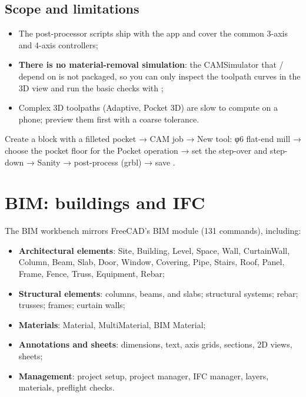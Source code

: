 \subsection{Scope and limitations}

\begin{itemize}
  \item The post-processor scripts ship with the app and cover the common 3-axis and 4-axis controllers;
  \item \textbf{There is no material-removal simulation}: the CAMSimulator that
        / depend on is not packaged, so you can only inspect the toolpath
        curves in the 3D view and run the basic checks with ;
  \item Complex 3D toolpaths (Adaptive, Pocket 3D) are slow to compute on a phone; preview them first with a coarse tolerance.
\end{itemize}

\begin{practice}
Create a block with a filleted pocket → CAM job → New tool: φ6 flat-end mill → choose the pocket floor for the Pocket operation →
set the step-over and step-down → Sanity → post-process (grbl) → save .
\end{practice}

\section{BIM: buildings and IFC}

The BIM workbench mirrors FreeCAD's BIM module (131 commands), including:

\begin{itemize}
  \item \textbf{Architectural elements}: Site, Building, Level, Space,
        Wall, CurtainWall, Column, Beam, Slab, Door,
        Window, Covering, Pipe, Stairs, Roof,
        Panel, Frame, Fence, Truss, Equipment, Rebar;
  \item \textbf{Structural elements}: columns, beams, and slabs; structural systems; rebar; trusses; frames; curtain walls;
  \item \textbf{Materials}: Material, MultiMaterial, BIM Material;
  \item \textbf{Annotations and sheets}: dimensions, text, axis grids, sections, 2D views, sheets;
  \item \textbf{Management}: project setup, project manager, IFC manager, layers, materials, preflight checks.
\end{itemize}


